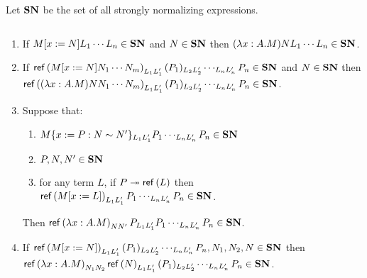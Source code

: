 
Let $\mathbf{SN}$ be the set of all strongly normalizing expressions.

\begin{lemma}
\label{lm:SN}
$ $
\begin{enumerate}
\item
\label{lm:SN1}
If $M[x:=N]L_1 \cdots L_n \in \mathbf{SN}$ and $N \in \mathbf{SN}$ then $(\lambda x:A.M)NL_1 \cdots L_n \in \mathbf{SN}$.
\item
\label{lm:SN2}
If $\mathsf{ref} \left( {M[x:=N]N_1 \cdots N_m} \right)_{L_1 L_1'} (P_1)_{L_2 L_2'} \cdots_{L_n L_n'} P_n \in \mathbf{SN}$ and $N \in \mathbf{SN}$ then
$\mathsf{ref} \left( {(\lambda x:A.M)NN_1 \cdots N_m} \right)_{L_1 L_1'} (P_1)_{L_2 L_2'} \cdots_{L_n L_n'} P_n \in \mathbf{SN}$.
\item
\label{lm:SN3}
Suppose that:
\begin{enumerate}
\item
\label{hypi}
$M\{x:=P:N\sim N'\}_{L_1 L_1'} P_1 \cdots_{L_n L_n'} P_n \in \mathbf{SN}$
\item
$P, N, N' \in \mathbf{SN}$
\item
\label{hypiii}
for any term $L$, if $P \twoheadrightarrow \mathsf{ref} \left( {L} \right)$
then $\mathsf{ref} \left( {M[x:=L]} \right)_{L_1 L_1'} P_1 \cdots_{L_n L_n'} P_n \in \mathbf{SN}$.
\end{enumerate}
Then $\mathsf{ref} \left( {\lambda x:A.M} \right)_{N N'} P_{L_1 L_1'} P_1 \cdots_{L_n L_n'} P_n \in \mathbf{SN}$.
\item
\label{lm:SN4}
If $\mathsf{ref} \left( {M[x:=N]} \right)_{L_1 L_1'} (P_1)_{L_2 L_2'} \cdots_{L_n L_n'} P_n, N_1, N_2, N \in \mathbf{SN}$ then \\
$\mathsf{ref} \left( {\lambda x:A.M} \right)_{N_1 N_2}\mathsf{ref} \left( {N} \right)_{L_1 L_1'} (P_1)_{L_2 L_2'} \cdots_{L_n L_n'} P_n \in \mathbf{SN}$.
\end{enumerate}
\end{lemma}

